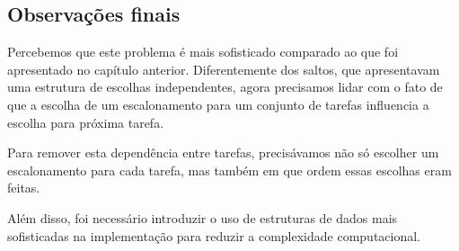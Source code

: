 \subsection*{Observações finais}

Percebemos que este problema é mais sofisticado comparado ao que foi apresentado no capítulo anterior. Diferentemente dos saltos, que apresentavam uma estrutura de escolhas independentes, agora precisamos lidar com o fato de que a escolha de um escalonamento para um conjunto de tarefas influencia a escolha para próxima tarefa.

Para remover esta dependência entre tarefas, precisávamos não só escolher um escalonamento para cada tarefa, mas também em que ordem essas escolhas eram feitas.

Além disso, foi necessário introduzir o uso de estruturas de dados mais sofisticadas na implementação para reduzir a complexidade computacional.